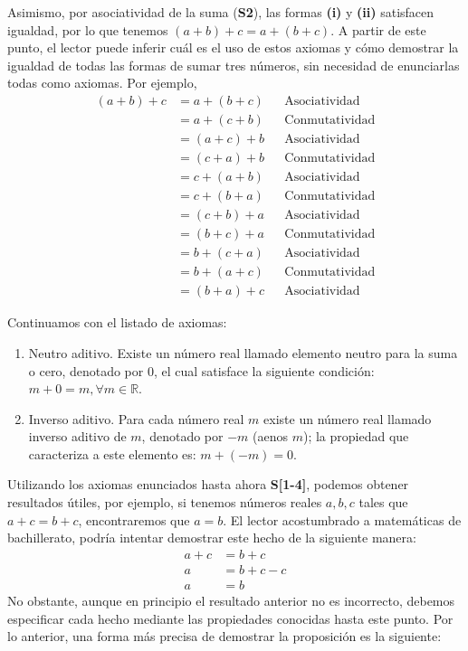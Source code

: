\documentclass[11pt]{article}
\newcommand{\R}{\mathbb{R}}
\begin{document}
Asimismo, por asociatividad de la suma (\textbf{S2}), las formas \textbf{(i)} y \textbf{(ii)} satisfacen igualdad, por lo que tenemos $(a+b)+c=a+(b+c)$. A partir de este punto, el lector puede inferir cuál es el uso de estos axiomas y cómo demostrar la igualdad de todas las formas de sumar tres números, sin necesidad de enunciarlas todas como axiomas. Por ejemplo, \begin{align*}
    (a+b)+c &= a+(b+c) && \text{Asociatividad}\\
    &= a+(c+b) && \text{Conmutatividad}\\
    &= (a+c)+b && \text{Asociatividad}\\
    &= (c+a)+b && \text{Conmutatividad}\\
    &= c+(a+b) && \text{Asociatividad}\\
    &= c+(b+a) && \text{Conmutatividad}\\
    &= (c+b)+a && \text{Asociatividad}\\
    &= (b+c)+a && \text{Conmutatividad}\\
    &= b+(c+a) && \text{Asociatividad}\\
    &= b+(a+c) && \text{Conmutatividad}\\
    &= (b+a)+c && \text{Asociatividad}
\end{align*}

Continuamos con el listado de axiomas:

\begin{enumerate}[start=3,label=S\arabic*.]
    \item Neutro aditivo. Existe un número real llamado elemento neutro para la suma o cero, denotado por $0$, el cual satisface la siguiente condición: $ m+0=m,\forall m \in \R $.
    \item Inverso aditivo. Para cada número real $m$ existe un número real llamado inverso aditivo de $m$, denotado por $-m$ (aenos $m$); la propiedad que caracteriza a este elemento es: $ m + (-m) = 0 $.
\end{enumerate}

Utilizando los axiomas enunciados hasta ahora \textbf{S[1-4]}, podemos obtener resultados útiles, por ejemplo, si tenemos números reales $a,b,c$ tales que $a+c=b+c$, encontraremos que $a=b$. El lector acostumbrado a matemáticas de bachillerato, podría intentar demostrar este hecho de la siguiente manera: \begin{align*}
    a+c &= b+c\\
    a &= b+c-c\\
    a &= b
\end{align*}
No obstante, aunque en principio el resultado anterior no es incorrecto, debemos especificar cada hecho mediante las propiedades conocidas hasta este punto. Por lo anterior, una forma más precisa de demostrar la proposición es la siguiente:
\end{document}
